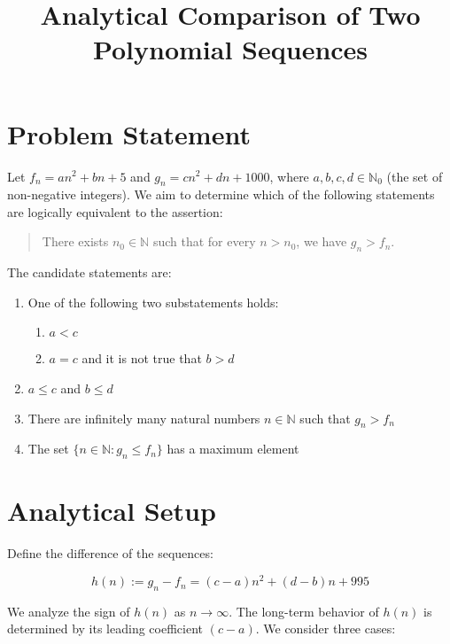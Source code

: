 \documentclass[12pt]{article}
\title{Analytical Comparison of Two Polynomial Sequences}
\author{}
\date{}
\begin{document}
\maketitle

\section{Problem Statement}

Let \( f_n = a n^2 + b n + 5 \) and \( g_n = c n^2 + d n + 1000 \), where \( a, b, c, d \in \mathbb{N}_0 \) (the set of non-negative integers). We aim to determine which of the following statements are logically equivalent to the assertion:

\begin{quote}
There exists \( n_0 \in \mathbb{N} \) such that for every \( n > n_0 \), we have \( g_n > f_n \).
\end{quote}

The candidate statements are:

\begin{enumerate}[label=\textbf{\alph*)}]
    \item One of the following two substatements holds:
    \begin{enumerate}[label=(\roman*)]
        \item \( a < c \)
        \item \( a = c \) and it is not true that \( b > d \)
    \end{enumerate}
    
    \item \( a \leq c \) and \( b \leq d \)
    
    \item There are infinitely many natural numbers \( n \in \mathbb{N} \) such that \( g_n > f_n \)
    
    \item The set \( \{ n \in \mathbb{N} : g_n \leq f_n \} \) has a maximum element
\end{enumerate}

\section{Analytical Setup}

Define the difference of the sequences:

\[
h(n) := g_n - f_n = (c - a)n^2 + (d - b)n + 995
\]

We analyze the sign of \( h(n) \) as \( n \to \infty \). The long-term behavior of \( h(n) \) is determined by its leading coefficient \( (c - a) \). We consider three cases:
\end{document}
